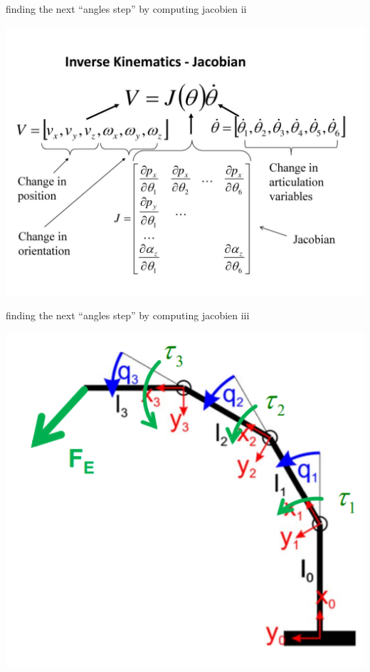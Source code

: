 \documentclass{beamer}
\begin{document}
\begin{frame}{finding the next ``angles step'' by computing jacobien ii}

\includegraphics[scale = 1.2]{slide_31.jpg}\cite{5}
\end{frame}

\begin{frame}{finding the next ``angles step'' by computing jacobien iii}

\includegraphics[scale = 0.7]{eth1.PNG}\cite{6}
\end{frame}
\end{document}
